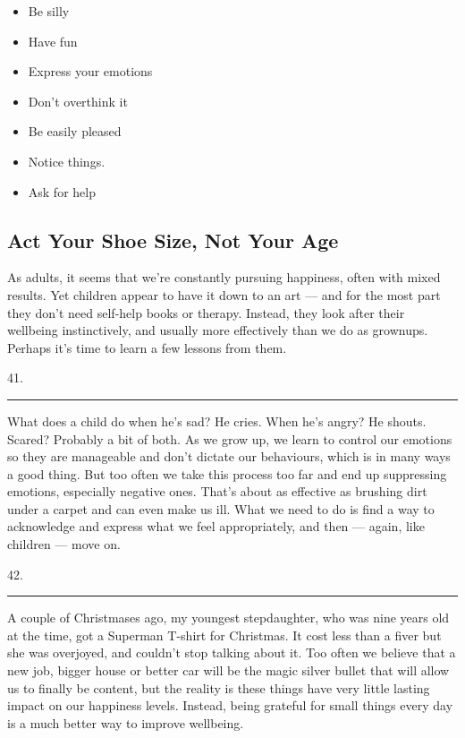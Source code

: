 \documentclass[UTF8,11pt]{ctexart}
\begin{document}
\begin{itemize}[leftmargin=2em,itemsep=.2em,topsep=.4em]\item[A.] Be silly
\item[B.] Have fun
\item[C.] Express your emotions
\item[D.] Don’t overthink it
\item[E.] Be easily pleased
\item[F.] Notice things.
\item[G.] Ask for help
\end{itemize}

\subsection*{\textbf{Act Your Shoe Size, Not Your Age}}


As adults, it seems that we’re constantly pursuing happiness, often with mixed results. Yet children appear to have it down to an art — and for the most part they don’t need self-help books or therapy. Instead, they look after their wellbeing instinctively, and usually more effectively than we do as grownups. Perhaps it’s time to learn a few lessons from them.


41. \par\noindent\rule{.95\linewidth}{.4pt}\par


What does a child do when he’s sad? He cries. When he’s angry? He shouts. Scared? Probably a bit of both. As we grow up, we learn to control our emotions so they are manageable and don’t dictate our behaviours, which is in many ways a good thing. But too often we take this process too far and end up suppressing emotions, especially negative ones. That’s about as effective as brushing dirt under a carpet and can even make us ill. What we need to do is find a way to acknowledge and express what we feel appropriately, and then — again, like children — move on.


42. \par\noindent\rule{.95\linewidth}{.4pt}\par


A couple of Christmases ago, my youngest stepdaughter, who was nine years old at the time, got a Superman T-shirt for Christmas. It cost less than a fiver but she was overjoyed, and couldn’t stop talking about it. Too often we believe that a new job, bigger house or better car will be the magic silver bullet that will allow us to finally be content, but the reality is these things have very little lasting impact on our happiness levels. Instead, being grateful for small things every day is a much better way to improve wellbeing.
\end{document}
